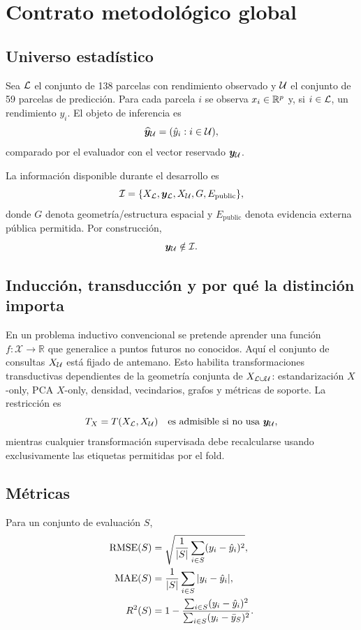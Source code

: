 \chapter*{Contrato metodológico global}
\label{chap:contract}

\section*{Universo estadístico}
Sea $\mathcal{L}$ el conjunto de 138 parcelas con rendimiento observado y $\mathcal{U}$ el conjunto
de 59 parcelas de predicción. Para cada parcela $i$ se observa $x_i\in\mathbb{R}^p$ y, si
$i\in\mathcal{L}$, un rendimiento $y_i$. El objeto de inferencia es
\[
\widehat{\bm y}_{\mathcal{U}}=(\hat y_i:i\in\mathcal{U}),
\]
comparado por el evaluador con el vector reservado $\bm y_{\mathcal{U}}$.

La información disponible durante el desarrollo es
\[
\mathcal I=
\{X_{\mathcal{L}},\bm y_{\mathcal{L}},X_{\mathcal{U}},G,E_{\mathrm{public}}\},
\]
donde $G$ denota geometría/estructura espacial y $E_{\mathrm{public}}$ denota evidencia
externa pública permitida. Por construcción,
\[
\bm y_{\mathcal{U}}\notin\mathcal I.
\]

\section*{Inducción, transducción y por qué la distinción importa}
En un problema inductivo convencional se pretende aprender una función
$f:\mathcal X\rightarrow\mathbb R$ que generalice a puntos futuros no conocidos. Aquí el
conjunto de consultas $X_{\mathcal{U}}$ está fijado de antemano. Esto habilita transformaciones
transductivas dependientes de la geometría conjunta de $X_{\mathcal{L}\cup\mathcal{U}}$: estandarización $X$-only,
PCA $X$-only, densidad, vecindarios, grafos y métricas de soporte. La restricción es
\[
T_X=T(X_{\mathcal{L}},X_{\mathcal{U}})\quad\text{es admisible si no usa }\bm y_{\mathcal{U}},
\]
mientras cualquier transformación supervisada debe recalcularse usando exclusivamente las
etiquetas permitidas por el fold.

\section*{Métricas}
Para un conjunto de evaluación $S$,
\begin{align}
\operatorname{RMSE}(S)&=\sqrt{\frac{1}{|S|}\sum_{i\in S}(y_i-\hat y_i)^2},\\
\operatorname{MAE}(S)&=\frac{1}{|S|}\sum_{i\in S}|y_i-\hat y_i|,\\
R^2(S)&=
1-\frac{\sum_{i\in S}(y_i-\hat y_i)^2}
{\sum_{i\in S}(y_i-\bar y_S)^2}.
\end{align}

